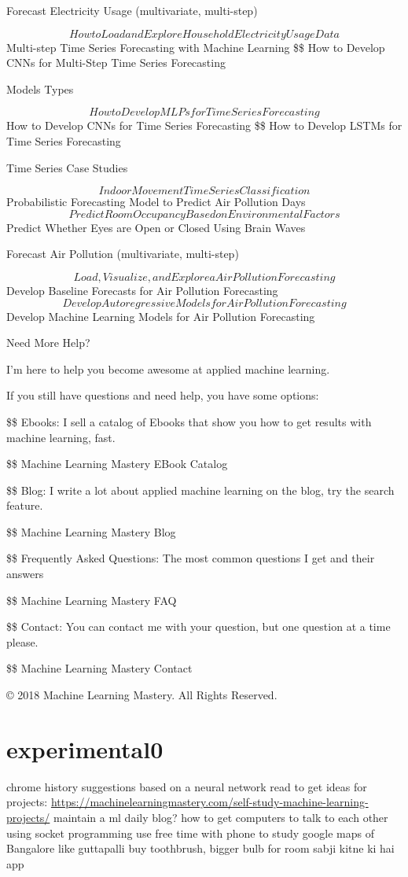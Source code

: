 \documentclass[11pt]{article}
\begin{document}
Forecast Electricity Usage (multivariate, multi-step)

$$ How to Load and Explore Household Electricity Usage Data
$$ Multi-step Time Series Forecasting with Machine Learning
\$\$ How to Develop CNNs for Multi-Step Time Series Forecasting

Models Types

$$ How to Develop MLPs for Time Series Forecasting
$$ How to Develop CNNs for Time Series Forecasting
\$\$ How to Develop LSTMs for Time Series Forecasting

Time Series Case Studies

$$ Indoor Movement Time Series Classification
$$ Probabilistic Forecasting Model to Predict Air Pollution Days
$$ Predict Room Occupancy Based on Environmental Factors
$$ Predict Whether Eyes are Open or Closed Using Brain Waves

Forecast Air Pollution (multivariate, multi-step)

$$ Load, Visualize, and Explore a Air Pollution Forecasting
$$ Develop Baseline Forecasts for Air Pollution Forecasting
$$ Develop Autoregressive Models for Air Pollution Forecasting
$$ Develop Machine Learning Models for Air Pollution Forecasting

Need More Help?

I’m here to help you become awesome at applied machine learning.

If you still have questions and need help, you have some options:

\$\$ Ebooks: I sell a catalog of Ebooks that show you how to get results with machine learning, fast. 

\$\$ Machine Learning Mastery EBook Catalog

\$\$ Blog: I write a lot about applied machine learning on the blog, try the search feature. 

\$\$ Machine Learning Mastery Blog

\$\$ Frequently Asked Questions: The most common questions I get and their answers 

\$\$ Machine Learning Mastery FAQ

\$\$ Contact: You can contact me with your question, but one question at a time please. 

\$\$ Machine Learning Mastery Contact

© 2018 Machine Learning Mastery. All Rights Reserved. 



\section{experimental0}
\label{sec:org9e2acc7}
chrome history suggestions based on a neural network
read to get ideas for projects: \url{https://machinelearningmastery.com/self-study-machine-learning-projects/}
maintain a ml daily blog?
how to get computers to talk to each other using socket programming
use free time with phone to study google maps of Bangalore like guttapalli
buy toothbrush, bigger bulb for room
sabji kitne ki hai app
\end{document}
